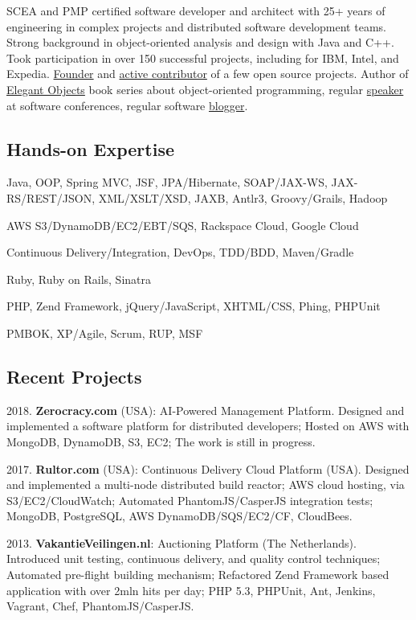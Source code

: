 \documentclass[12pt]{article}
\begin{document}
SCEA and PMP certified software developer and architect with
25+ years of engineering in complex projects and distributed software
development teams. Strong background in object-oriented analysis and design
with Java and C++. Took participation in over 150 successful projects,
including for IBM, Intel, and Expedia. \href{http://www.yegor256.com/pets.html}{Founder}
and \href{https://github.com/yegor256}{active contributor} of
a few open source projects. Author of
\href{http://www.yegor256.com/elegant-objects.html}{Elegant Objects}
book series about object-oriented programming,
regular \href{http://www.yegor256.com/talks.html}{speaker} at software conferences, regular software
\href{http://www.yegor256.com}{blogger}.

\subsection*{Hands-on Expertise}

Java, OOP, Spring MVC, JSF, JPA/Hibernate, SOAP/JAX-WS,
JAX-RS/REST/JSON, XML/XSLT/XSD, JAXB, Antlr3, Groovy/Grails, Hadoop

AWS S3/DynamoDB/EC2/EBT/SQS, Rackspace Cloud, Google Cloud

Continuous Delivery/Integration, DevOps, TDD/BDD, Maven/Gradle

Ruby, Ruby on Rails, Sinatra

PHP, Zend Framework, jQuery/JavaScript, XHTML/CSS, Phing, PHPUnit

PMBOK, XP/Agile, Scrum, RUP, MSF

\subsection*{Recent Projects}

2018. \textbf{Zerocracy.com} (USA): AI-Powered Management Platform.
Designed and implemented a software platform for distributed developers;
Hosted on AWS with MongoDB, DynamoDB, S3, EC2;
The work is still in progress.

2017. \textbf{Rultor.com} (USA): Continuous Delivery Cloud Platform (USA).
Designed and implemented a multi-node distributed build reactor;
AWS cloud hosting, via S3/EC2/CloudWatch;
Automated PhantomJS/CasperJS integration tests;
MongoDB, PostgreSQL, AWS DynamoDB/SQS/EC2/CF, CloudBees.

2013. \textbf{VakantieVeilingen.nl}: Auctioning Platform (The Netherlands).
Introduced unit testing, continuous delivery, and quality control techniques;
Automated pre-flight building mechanism;
Refactored Zend Framework based application with over 2mln hits per day;
PHP 5.3, PHPUnit, Ant, Jenkins, Vagrant, Chef, PhantomJS/CasperJS.
\end{document}
